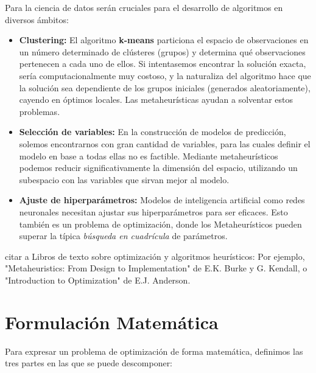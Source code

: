 \documentclass[12pt,a4paper]{book}
\begin{document}
Para la ciencia de datos serán cruciales para el desarrollo de algoritmos en diversos ámbitos:
\begin{itemize}
    \item \textbf{Clustering:} El algoritmo \textbf{k-means} particiona el espacio de observaciones en un número determinado de clústeres (grupos) y determina qué observaciones pertenecen a cada uno de ellos. 
    Si intentasemos encontrar la solución exacta, sería computacionalmente muy costoso, y la naturaliza del algoritmo hace que la solución sea dependiente de los grupos iniciales (generados aleatoriamente), cayendo en óptimos locales.
    Las metaheurísticas ayudan a solventar estos problemas.
    \item \textbf{Selección de variables:} En la construcción de modelos de predicción, solemos encontrarnos con gran cantidad de variables, para las cuales definir el modelo en base a todas ellas no es factible. Mediante metaheurísticos podemos 
    reducir significativamente la dimensión del espacio, utilizando un subespacio con las variables que sirvan mejor al modelo.
    \item \textbf{Ajuste de hiperparámetros:} Modelos de inteligencia artificial como redes neuronales necesitan ajustar sus hiperparámetros para ser eficaces. Esto también es un problema de optimización, donde los Metaheurísticos pueden superar la típica \textit{búsqueda en cuadrícula} de parámetros.
\end{itemize}

\color{red} citar a Libros de texto sobre optimización y algoritmos heurísticos: Por ejemplo, "Metaheuristics: From Design to Implementation" de E.K. Burke y G. Kendall, o "Introduction to Optimization" de E.J. Anderson. \color{black}

\section{Formulación Matemática}

Para expresar un problema de optimización de forma matemática, definimos las tres partes en las que se puede descomponer:
\end{document}
